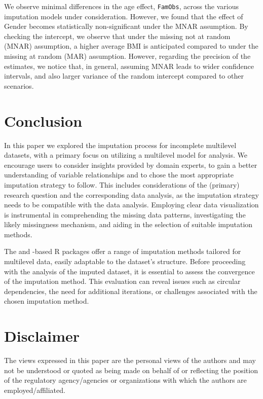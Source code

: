 \documentclass[
  article]{jss}
\begin{document}
We observe minimal differences in the age effect, \texttt{FamObs},
across the various imputation models under consideration. However, we
found that the effect of Gender becomes statistically non-significant
under the MNAR assumption. By checking the intercept, we observe that
under the missing not at random (MNAR) assumption, a higher average BMI
is anticipated compared to under the missing at random (MAR) assumption.
However, regarding the precision of the estimates, we notice that, in
general, assuming MNAR leads to wider confidence intervals, and also
larger variance of the random intercept compared to other scenarios.

\section{Conclusion}\label{conclusion}

In this paper we explored the imputation process for incomplete
multilevel datasets, with a primary focus on utilizing a multilevel
model for analysis. We encourage users to consider insights provided by
domain experts, to gain a better understanding of variable relationships
and to chose the most appropriate imputation strategy to follow. This
includes considerations of the (primary) research question and the
corresponding data analysis, as the imputation strategy needs to be
compatible with the data analysis. Employing clear data visualization is
instrumental in comprehending the missing data patterns, investigating
the likely missingness mechanism, and aiding in the selection of
suitable imputation methods.

The  and -based R packages offer a range of
imputation methods tailored for multilevel data, easily adaptable to the
dataset's structure. Before proceeding with the analysis of the imputed
dataset, it is essential to assess the convergence of the imputation
method. This evaluation can reveal issues such as circular dependencies,
the need for additional iterations, or challenges associated with the
chosen imputation method.

\section*{Disclaimer}\label{disclaimer}

The views expressed in this paper are the personal views of the authors
and may not be understood or quoted as being made on behalf of or
reflecting the position of the regulatory agency/agencies or
organizations with which the authors are employed/affiliated.
\end{document}
